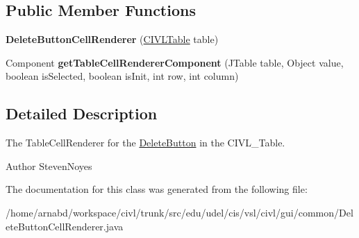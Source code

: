 \subsection*{Public Member Functions}
\begin{DoxyCompactItemize}
\item 
\hypertarget{classedu_1_1udel_1_1cis_1_1vsl_1_1civl_1_1gui_1_1common_1_1DeleteButtonCellRenderer_ae5317a8add5e55a57c0f67e8eb06f5a2}{}{\bfseries Delete\+Button\+Cell\+Renderer} (\hyperlink{classedu_1_1udel_1_1cis_1_1vsl_1_1civl_1_1gui_1_1common_1_1CIVLTable}{C\+I\+V\+L\+Table} table)\label{classedu_1_1udel_1_1cis_1_1vsl_1_1civl_1_1gui_1_1common_1_1DeleteButtonCellRenderer_ae5317a8add5e55a57c0f67e8eb06f5a2}

\item 
\hypertarget{classedu_1_1udel_1_1cis_1_1vsl_1_1civl_1_1gui_1_1common_1_1DeleteButtonCellRenderer_a808b9f4a29b3757f178733f0b9bdb853}{}Component {\bfseries get\+Table\+Cell\+Renderer\+Component} (J\+Table table, Object value, boolean is\+Selected, boolean is\+Init, int row, int column)\label{classedu_1_1udel_1_1cis_1_1vsl_1_1civl_1_1gui_1_1common_1_1DeleteButtonCellRenderer_a808b9f4a29b3757f178733f0b9bdb853}

\end{DoxyCompactItemize}


\subsection{Detailed Description}
The Table\+Cell\+Renderer for the \hyperlink{classedu_1_1udel_1_1cis_1_1vsl_1_1civl_1_1gui_1_1common_1_1DeleteButton}{Delete\+Button} in the C\+I\+V\+L\+\_\+\+Table. 

\begin{DoxyAuthor}{Author}
Steven\+Noyes 
\end{DoxyAuthor}


The documentation for this class was generated from the following file\+:\begin{DoxyCompactItemize}
\item 
/home/arnabd/workspace/civl/trunk/src/edu/udel/cis/vsl/civl/gui/common/Delete\+Button\+Cell\+Renderer.\+java\end{DoxyCompactItemize}
